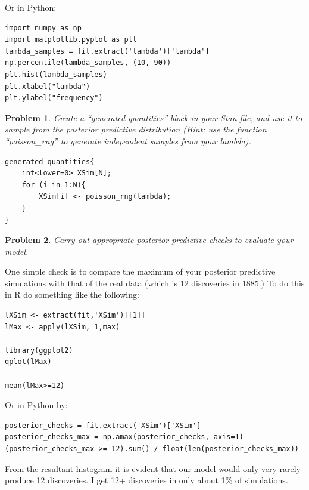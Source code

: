\documentclass{article}
\newtheorem{problem}{Problem}[section]
\begin{document}
Or in Python:

\begin{verbatim}
import numpy as np
import matplotlib.pyplot as plt
lambda_samples = fit.extract('lambda')['lambda']
np.percentile(lambda_samples, (10, 90))
plt.hist(lambda_samples)
plt.xlabel("lambda")
plt.ylabel("frequency")
\end{verbatim}

\begin{problem}
	Create a ``generated quantities'' block in your Stan file, and use it to sample from the posterior predictive distribution (Hint: use the function ``poisson\_rng'' to generate independent samples from your lambda).
\end{problem}

\begin{verbatim}
generated quantities{
    int<lower=0> XSim[N];
    for (i in 1:N){
        XSim[i] <- poisson_rng(lambda);
    }
}
\end{verbatim}

\begin{problem}
	Carry out appropriate posterior predictive checks to evaluate your model.
\end{problem}

One simple check is to compare the maximum of your posterior predictive simulations with that of the real data (which is 12 discoveries in 1885.) To do this in R do something like the following:

\begin{verbatim}
lXSim <- extract(fit,'XSim')[[1]]
lMax <- apply(lXSim, 1,max)

library(ggplot2)
qplot(lMax)

mean(lMax>=12)
\end{verbatim}

Or in Python by:

\begin{verbatim}
posterior_checks = fit.extract('XSim')['XSim']
posterior_checks_max = np.amax(posterior_checks, axis=1)
(posterior_checks_max >= 12).sum() / float(len(posterior_checks_max))
\end{verbatim}

From the resultant histogram it is evident that our model would only very rarely produce 12 discoveries. I get 12+ discoveries in only about 1\% of simulations. 
\end{document}
